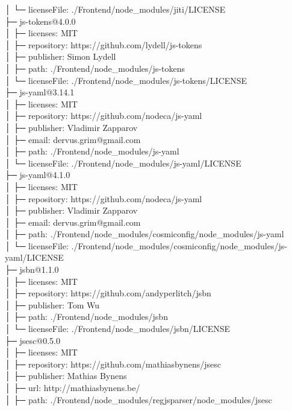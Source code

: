 │  └─ licenseFile: ./Frontend/node\_modules/jiti/LICENSE\\
├─ js-tokens@4.0.0\\
│  ├─ licenses: MIT\\
│  ├─ repository: https://github.com/lydell/js-tokens\\
│  ├─ publisher: Simon Lydell\\
│  ├─ path: ./Frontend/node\_modules/js-tokens\\
│  └─ licenseFile: ./Frontend/node\_modules/js-tokens/LICENSE\\
├─ js-yaml@3.14.1\\
│  ├─ licenses: MIT\\
│  ├─ repository: https://github.com/nodeca/js-yaml\\
│  ├─ publisher: Vladimir Zapparov\\
│  ├─ email: dervus.grim@gmail.com\\
│  ├─ path: ./Frontend/node\_modules/js-yaml\\
│  └─ licenseFile: ./Frontend/node\_modules/js-yaml/LICENSE\\
├─ js-yaml@4.1.0\\
│  ├─ licenses: MIT\\
│  ├─ repository: https://github.com/nodeca/js-yaml\\
│  ├─ publisher: Vladimir Zapparov\\
│  ├─ email: dervus.grim@gmail.com\\
│  ├─ path: ./Frontend/node\_modules/cosmiconfig/node\_modules/js-yaml\\
│  └─ licenseFile: ./Frontend/node\_modules/cosmiconfig/node\_modules/js-yaml/LICENSE\\
├─ jsbn@1.1.0\\
│  ├─ licenses: MIT\\
│  ├─ repository: https://github.com/andyperlitch/jsbn\\
│  ├─ publisher: Tom Wu\\
│  ├─ path: ./Frontend/node\_modules/jsbn\\
│  └─ licenseFile: ./Frontend/node\_modules/jsbn/LICENSE\\
├─ jsesc@0.5.0\\
│  ├─ licenses: MIT\\
│  ├─ repository: https://github.com/mathiasbynens/jsesc\\
│  ├─ publisher: Mathias Bynens\\
│  ├─ url: http://mathiasbynens.be/\\
│  ├─ path: ./Frontend/node\_modules/regjsparser/node\_modules/jsesc\\
